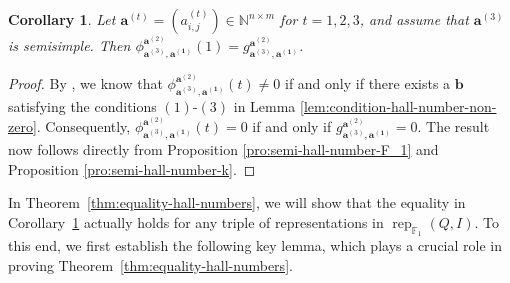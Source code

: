 \documentclass[12pt]{amsart}
\newtheorem{corollary}[theorem]{Corollary}
\theoremstyle{remark}
\theoremstyle{definition}
\numberwithin{equation}{section}
\begin{document}
\begin{corollary}\label{cor:hall-number-semisimple}
    Let $\mathbf{a}^{(t)}=(a_{i,j}^{(t)})\in \mathbb{N}^{n\times m}$ for $t=1,2,3$, and assume that $\mathbf{a}^{(3)}$ is semisimple. Then $\phi_{\mathbf{a}^{(3)},\mathbf{a^{(1)}}}^{\mathbf{a}^{(2)}}(1)=g_{\mathbf{a}^{(3)},\mathbf{a^{(1)}}}^{\mathbf{a}^{(2)}}$.
\end{corollary}
\begin{proof}
    By \cite[Lemmas 3.1, 3.2]{G95}, we know that $\phi_{\mathbf{a}^{(3)},\mathbf{a^{(1)}}}^{\mathbf{a}^{(2)}}(t)\neq 0$ if and only if there exists a $\mathbf{b}$ satisfying the conditions $(1)$-$(3)$ in Lemma \ref{lem:condition-hall-number-non-zero}. Consequently, $\phi_{\mathbf{a}^{(3)},\mathbf{a^{(1)}}}^{\mathbf{a}^{(2)}}(t)=0$ if and only if $g_{\mathbf{a}^{(3)},\mathbf{a^{(1)}}}^{\mathbf{a}^{(2)}}=0$. The result now follows directly from Proposition \ref{pro:semi-hall-number-F_1} and Proposition \ref{pro:semi-hall-number-k}.
\end{proof}

In Theorem~\ref{thm:equality-hall-numbers}, we will show that the equality in Corollary~\ref{cor:hall-number-semisimple} actually holds for any triple of representations in $\operatorname{rep}_{\mathbb{F}_1}(Q,I)$. To this end, we first establish the following key lemma, which plays a crucial role in proving Theorem~\ref{thm:equality-hall-numbers}.
\end{document}
